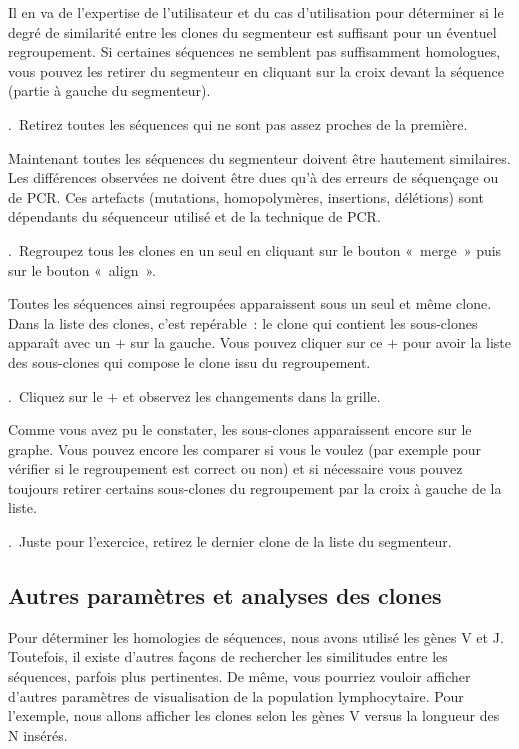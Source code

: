 \documentclass[11pt]{article}
\newcounter{questionum}
\newcommand\com[1]{\textsf{«~#1~»}}
\newcommand\question[1]{\par\noindent\textbf{\thequestionum}.~#1\addtocounter{questionum}{1}}
\begin{document}
Il en va de l'expertise de l'utilisateur et du cas d'utilisation pour déterminer si le degré de
similarité entre les clones du segmenteur est suffisant pour un éventuel
regroupement. Si certaines séquences ne semblent pas suffisamment homologues,
vous pouvez les retirer du segmenteur en cliquant sur la croix devant la
séquence (partie à gauche du segmenteur).

\question{Retirez toutes les séquences qui ne sont pas assez proches de la
  première.}

Maintenant toutes les séquences du segmenteur doivent être hautement
similaires. Les différences observées ne doivent être dues qu'à des
erreurs de séquençage ou de PCR. Ces artefacts (mutations,
homopolymères, insertions, délétions) sont dépendants du séquenceur
utilisé et de la technique de PCR.

\question{Regroupez tous les clones en un seul en cliquant sur le bouton \com{merge}
  puis sur le bouton \com{align}.}

Toutes les séquences ainsi regroupées apparaissent sous un seul et même
clone. Dans la liste des clones, c'est repérable~: le clone qui contient
les sous-clones apparaît avec un $+$ sur la gauche. Vous pouvez
cliquer sur ce $+$ pour avoir la liste des sous-clones qui compose le
clone issu du regroupement.

\question{Cliquez sur le $+$ et observez les changements dans la grille.}

Comme vous avez pu le constater, les sous-clones apparaissent encore sur
le graphe. Vous pouvez encore les comparer si vous le voulez (par
exemple pour vérifier si le regroupement est correct ou non) et si nécessaire
vous pouvez toujours retirer certains sous-clones du regroupement par la croix
à gauche de la liste.

\question{Juste pour l'exercice, retirez le dernier clone de la liste du
  segmenteur.}

\subsection{Autres paramètres et analyses des clones}

Pour déterminer les homologies de séquences, nous avons utilisé
les gènes V et J. Toutefois, il existe d'autres façons de
rechercher les similitudes entre les séquences, parfois plus
pertinentes. De même, vous pourriez vouloir afficher d'autres paramètres
de visualisation de la population lymphocytaire. Pour l'exemple, nous
allons afficher les clones selon les gènes V versus la longueur
des N insérés.
\end{document}
